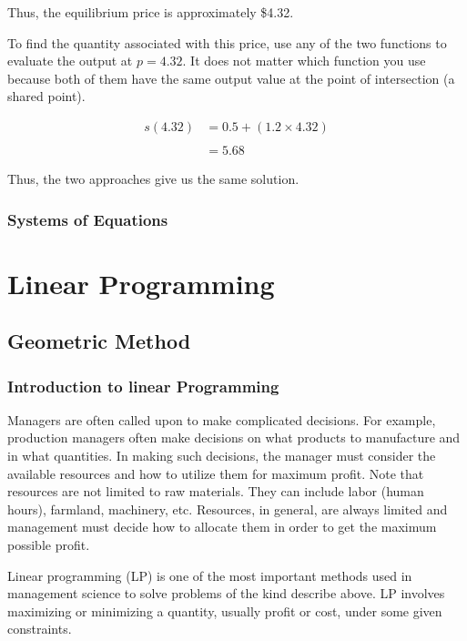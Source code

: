 \documentclass[
  letterpaper,
  DIV=11,
  numbers=noendperiod]{scrreprt}
\begin{document}
Thus, the equilibrium price is approximately \$4.32.

To find the quantity associated with this price, use any of the two
functions to evaluate the output at \(p=4.32\). It does not matter which
function you use because both of them have the same output value at the
point of intersection (a shared point).

\begin{align}
s(4.32)&=0.5+(1.2\times 4.32)\\ \\
&= 5.68
\end{align}

Thus, the two approaches give us the same solution.

\hypertarget{systems-of-equations}{%
\section{Systems of Equations}\label{systems-of-equations}}

\part{Linear Programming}

\hypertarget{geometric-method}{%
\chapter{Geometric Method}\label{geometric-method}}

\hypertarget{introduction-to-linear-programming}{%
\section{Introduction to linear
Programming}\label{introduction-to-linear-programming}}

Managers are often called upon to make complicated decisions. For
example, production managers often make decisions on what products to
manufacture and in what quantities. In making such decisions, the
manager must consider the available resources and how to utilize them
for maximum profit. Note that resources are not limited to raw
materials. They can include labor (human hours), farmland, machinery,
etc. Resources, in general, are always limited and management must
decide how to allocate them in order to get the maximum possible profit.

Linear programming (LP) is one of the most important methods used in
management science to solve problems of the kind describe above. LP
involves maximizing or minimizing a quantity, usually profit or cost,
under some given constraints.
\end{document}

